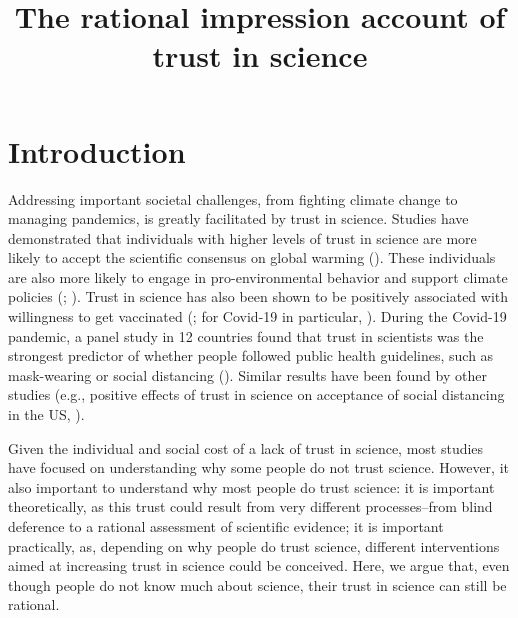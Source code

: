 \documentclass[
  jou,
  floatsintext,
  longtable,
  nolmodern,
  notxfonts,
  notimes,
  colorlinks=true,linkcolor=blue,citecolor=blue,urlcolor=blue]{apa7}
\title{The rational impression account of trust in science}
\affiliation{
{Institut Jean Nicod, Département d'études cognitives, ENS, EHESS, PSL
University, CNRS, France}}
\begin{document}
\maketitle


\setcounter{secnumdepth}{-\maxdimen} %

\setlength\LTleft{0pt}


\section{Introduction}\label{introduction}

Addressing important societal challenges, from fighting climate change
to managing pandemics, is greatly facilitated by trust in science.
Studies have demonstrated that individuals with higher levels of trust
in science are more likely to accept the scientific consensus on global
warming (). These individuals are also more likely to engage in
pro-environmental behavior and support climate policies
(;
). Trust in science has also been shown to be positively
associated with willingness to get vaccinated
(; for
Covid-19 in particular,
). During the Covid-19 pandemic, a panel study in 12 countries
found that trust in scientists was the strongest predictor of whether
people followed public health guidelines, such as mask-wearing or social
distancing (). Similar results have been found by other studies (e.g., positive
effects of trust in science on acceptance of social distancing in the
US, ).

Given the individual and social cost of a lack of trust in science, most
studies have focused on understanding why some people do not trust
science. However, it also important to understand why most people do
trust science: it is important theoretically, as this trust could result
from very different processes--from blind deference to a rational
assessment of scientific evidence; it is important practically, as,
depending on why people do trust science, different interventions aimed
at increasing trust in science could be conceived. Here, we argue that,
even though people do not know much about science, their trust in
science can still be rational.
\end{document}
